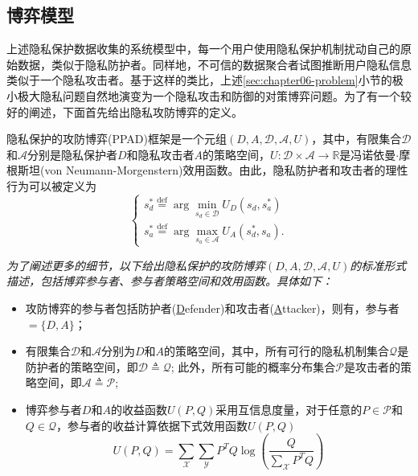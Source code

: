 \subsection{博弈模型}\label{subsec:chapter06-gamemodel}
上述隐私保护数据收集的系统模型中，每一个用户使用隐私保护机制扰动自己的原始数据，类似于隐私防护者。同样地，不可信的数据聚合者试图推断用户隐私信息类似于一个隐私攻击者。基于这样的类比，上述\ref{sec:chapter06-problem}小节的极小极大隐私问题自然地演变为一个隐私攻击和防御的对策博弈问题。为了有一个较好的阐述，下面首先给出隐私攻防博弈的定义。

\begin{definition}\label{def:PPAD}隐私保护的攻防博弈(PPAD)框架是一个元组$(D,A,\mathcal{D},\mathcal{A},U)$，其中，有限集合$\mathcal{D}$和$\mathcal{A}$分别是隐私保护者$D$和隐私攻击者$A$的策略空间，$U:\mathcal{D}\times \mathcal{A}\rightarrow\mathbb{R}$是冯诺依曼$\cdot$摩根斯坦(von Neumann-Morgenstern)效用函数。由此，隐私防护者和攻击者的理性行为可以被定义为
	\begin{equation}
		\begin{cases}
			s_{d}^{*} \overset{\text{def}}{=} \arg \min_{s_{d}\in \mathcal{D}}U_{D}(s_{d},s_{a}^{*})\\
			s_{a}^{*} \overset{\text{def}}{=} \arg \max_{s_{a}\in \mathcal{A}}U_{A}(s_{d}^{*},s_{a}).
		\end{cases}
	\end{equation}
\end{definition}




{\em 为了阐述更多的细节，以下给出隐私保护的攻防博弈$(D,A,\mathcal{D},\mathcal{A},U)$的标准形式描述，包括博弈参与者、参与者策略空间和效用函数。具体如下：
	\begin{itemize}
	\item 攻防博弈的参与者包括防护者(\underline{D}efender)和攻击者(\underline{A}ttacker)，则有，参与者$=\{D,A\}$；
	
	\item 有限集合$\mathcal{D}$和$\mathcal{A}$分别为$D$和$A$的策略空间，其中，所有可行的隐私机制集合$\mathcal{Q}$是防护者的策略空间，即$\mathcal{D} \triangleq \mathcal{Q}$; 此外，所有可能的概率分布集合$\mathcal{P}$是攻击者的策略空间，即$\mathcal{A} \triangleq \mathcal{P}$;
	
	\item 博弈参与者$D$和$A$的收益函数$U(P,Q)$采用互信息度量，对于任意的$P \in \mathcal{P}$和$Q \in \mathcal{Q}$，参与者的收益计算依据下式效用函数$U(P,Q)$
	\begin{equation} \label{eq:MI}
		U(P,Q)= \sum_{\mathcal{X}}\sum_{\mathcal{\mathcal{Y}}}P^{T}Q\log \left(\frac{Q}{\sum_{\mathcal{X}}P^{T}Q}\right)
	\end{equation}
	\end{itemize}

}

